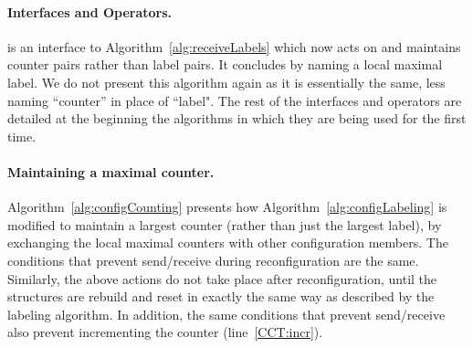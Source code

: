 \documentclass[11pt]{article}
\begin{document}
\paragraph{Interfaces and Operators.}
 is an interface to Algorithm~\ref{alg:receiveLabels} which now acts on and maintains counter pairs rather than label pairs.
It concludes by naming a local maximal label.
We do not present this algorithm again as it is essentially the same, less naming ``counter'' in place of ``label".
The rest of the interfaces and operators are detailed at the beginning the algorithms in which they are being used for the first time.


\paragraph{Maintaining a maximal counter.} Algorithm~\ref{alg:configCounting} presents how Algorithm~\ref{alg:configLabeling} is modified to maintain a largest counter (rather than just the largest label), by exchanging the local maximal counters with other configuration members.
The conditions that prevent send/receive during reconfiguration are the same.
Similarly, the above actions do not take place after reconfiguration, until the structures are rebuild and reset in exactly the same way as described by the labeling algorithm.
In addition, the same conditions that prevent send/receive also prevent incrementing the counter (line~\ref{CCT:incr}).
\end{document}
